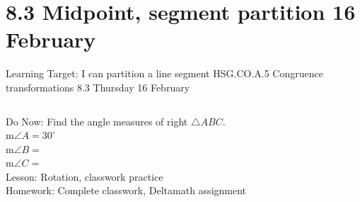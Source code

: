 \section{8.3 Midpoint, segment partition \hfill 16 February \,}
\begin{frame}{Learning Target: I can partition a line segment}
  {HSG.CO.A.5 Congruence transformations \hfill \alert{8.3 Thursday 16 February}}
  \begin{columns}
    Do Now: Find the angle measures of right $\triangle ABC$. \\
    m$\angle A= 30^\circ$ \\
    m$\angle B=$ \\
    m$\angle C=$ \\[0.5cm]
    Lesson: Rotation, classwork practice \\
    Homework: Complete classwork, Deltamath assignment
    \begin{flushright}
    \end{flushright}
  \end{columns}
\end{frame}

